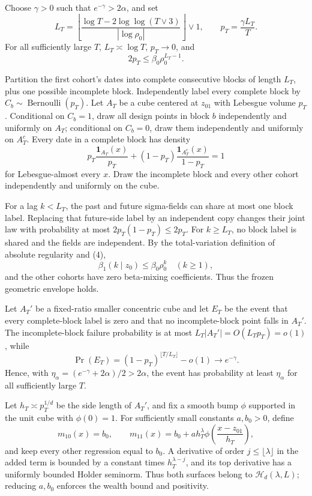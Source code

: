 Choose \(\gamma>0\) such that \(e^{-\gamma}>2\alpha\), and set
\[
 L_T=\left\lfloor
 \frac{\log T-2\log\log(T\vee3)}{|\log\rho_0|}
 \right\rfloor\vee1,
 \qquad
 p_T=\frac{\gamma L_T}{T}.                                 \tag{3}
\]
For all sufficiently large \(T\), \(L_T\asymp\log T\), \(p_T\to0\), and
\[
 2p_T\le\beta_0\rho_0^{L_T-1}.                             \tag{4}
\]

Partition the first cohort's dates into complete consecutive blocks of length \(L_T\), plus one possible incomplete block.  Independently label every complete block by
\(C_b\sim\operatorname{Bernoulli}(p_T)\).  Let \(A_T\) be a cube centered at \(z_{01}\) with Lebesgue volume \(p_T\).  Conditional on \(C_b=1\), draw all design points in block \(b\) independently and uniformly on \(A_T\); conditional on \(C_b=0\), draw them independently and uniformly on \(A_T^c\).  Every date in a complete block has density
\[
 p_T\frac{\mathbf1_{A_T}(x)}{p_T}
 +(1-p_T)\frac{\mathbf1_{A_T^c}(x)}{1-p_T}=1               \tag{5}
\]
for Lebesgue-almost every \(x\).  Draw the incomplete block and every other cohort independently and uniformly on the cube.

For a lag \(k<L_T\), the past and future sigma-fields can share at most one block label.  Replacing that future-side label by an independent copy changes their joint law with probability at most \(2p_T(1-p_T)\le2p_T\).  For \(k\ge L_T\), no block label is shared and the fields are independent.  By the total-variation definition of absolute regularity and (4),
\[
 \beta_1(k\mid z_0)\le\beta_0\rho_0^k
 \quad(k\ge1),                                             \tag{6}
\]
and the other cohorts have zero beta-mixing coefficients.  Thus the frozen geometric envelope holds.

Let \(A_T'\) be a fixed-ratio smaller concentric cube and let \(E_T\) be the event that every complete-block label is zero and that no incomplete-block point falls in \(A_T'\).  The incomplete-block failure probability is at most \(L_T|A_T'|=O(L_Tp_T)=o(1)\), while
\[
 \Pr(E_T)=(1-p_T)^{\lfloor T/L_T\rfloor}-o(1)
 \longrightarrow e^{-\gamma}.                              \tag{7}
\]
Hence, with
\(\eta_\alpha=(e^{-\gamma}+2\alpha)/2>2\alpha\), the event has probability at least \(\eta_\alpha\) for all sufficiently large \(T\).

Let \(h_T\asymp p_T^{1/d}\) be the side length of \(A_T'\), and fix a smooth bump \(\phi\) supported in the unit cube with \(\phi(0)=1\).  For sufficiently small constants \(a,b_0>0\), define
\[
 m_{10}(x)=b_0,
 \qquad
 m_{11}(x)=b_0+ah_T^\lambda
 \phi\!\left(\frac{x-z_{01}}{h_T}\right),                 \tag{8}
\]
and keep every other regression equal to \(b_0\).  A derivative of order \(j\le\lfloor\lambda\rfloor\) in the added term is bounded by a constant times \(h_T^{\lambda-j}\), and its top derivative has a uniformly bounded Holder seminorm.  Thus both surfaces belong to \(\mathcal H_d(\lambda,L)\); reducing \(a,b_0\) enforces the wealth bound and positivity.

